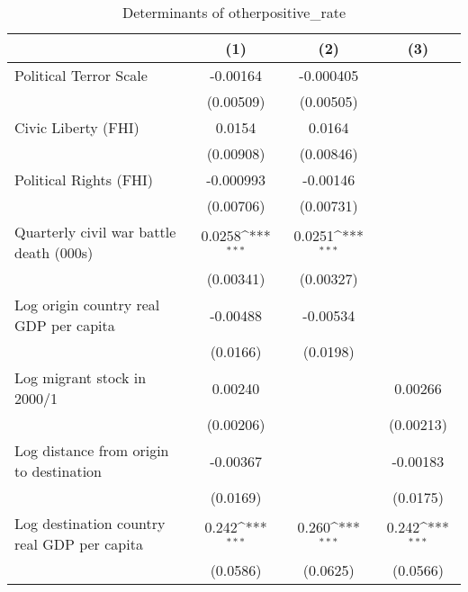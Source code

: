 \begin{table}[htbp]\centering
\def\sym#1{\ifmmode^{#1}\else\(^{#1}\)\fi}
\caption{Determinants of otherpositive\_rate}
\begin{tabular}{l*{3}{c}}
\hline\hline
                    &\multicolumn{1}{c}{(1)}         &\multicolumn{1}{c}{(2)}         &\multicolumn{1}{c}{(3)}         \\
\hline
Political Terror Scale&    -0.00164         &   -0.000405         &                     \\
                    &   (0.00509)         &   (0.00505)         &                     \\
[1em]
Civic Liberty (FHI) &      0.0154         &      0.0164         &                     \\
                    &   (0.00908)         &   (0.00846)         &                     \\
[1em]
Political Rights (FHI)&   -0.000993         &    -0.00146         &                     \\
                    &   (0.00706)         &   (0.00731)         &                     \\
[1em]
Quarterly civil war battle death (000s)&      0.0258\sym{***}&      0.0251\sym{***}&                     \\
                    &   (0.00341)         &   (0.00327)         &                     \\
[1em]
Log origin country real GDP per capita&    -0.00488         &    -0.00534         &                     \\
                    &    (0.0166)         &    (0.0198)         &                     \\
[1em]
Log migrant stock in 2000/1&     0.00240         &                     &     0.00266         \\
                    &   (0.00206)         &                     &   (0.00213)         \\
[1em]
Log distance from origin to destination&    -0.00367         &                     &    -0.00183         \\
                    &    (0.0169)         &                     &    (0.0175)         \\
[1em]
Log destination country real GDP per capita&       0.242\sym{***}&       0.260\sym{***}&       0.242\sym{***}\\
                    &    (0.0586)         &    (0.0625)         &    (0.0566)         \\

\end{tabular}
\end{table}
